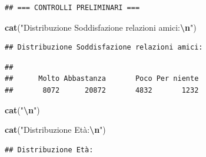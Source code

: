 \documentclass[
]{article}
\newenvironment{Shaded}{\begin{snugshade}}{\end{snugshade}}
\newcommand{\FunctionTok}[1]{\textcolor[rgb]{0.13,0.29,0.53}{\textbf{#1}}}
\newcommand{\NormalTok}[1]{#1}
\newcommand{\SpecialCharTok}[1]{\textcolor[rgb]{0.81,0.36,0.00}{\textbf{#1}}}
\newcommand{\StringTok}[1]{\textcolor[rgb]{0.31,0.60,0.02}{#1}}
\begin{document}
\begin{verbatim}
## === CONTROLLI PRELIMINARI ===
\end{verbatim}

\begin{Shaded}
\begin{Highlighting}[]
\FunctionTok{cat}\NormalTok{(}\StringTok{"Distribuzione Soddisfazione relazioni amici:}\SpecialCharTok{\textbackslash{}n}\StringTok{"}\NormalTok{)}
\end{Highlighting}
\end{Shaded}

\begin{verbatim}
## Distribuzione Soddisfazione relazioni amici:
\end{verbatim}

\begin{Shaded}
\end{Shaded}

\begin{verbatim}
## 
##      Molto Abbastanza       Poco Per niente 
##       8072      20872       4832       1232
\end{verbatim}

\begin{Shaded}
\begin{Highlighting}[]
\FunctionTok{cat}\NormalTok{(}\StringTok{"}\SpecialCharTok{\textbackslash{}n}\StringTok{"}\NormalTok{)}
\end{Highlighting}
\end{Shaded}

\begin{Shaded}
\begin{Highlighting}[]
\FunctionTok{cat}\NormalTok{(}\StringTok{"Distribuzione Età:}\SpecialCharTok{\textbackslash{}n}\StringTok{"}\NormalTok{)}
\end{Highlighting}
\end{Shaded}

\begin{verbatim}
## Distribuzione Età:
\end{verbatim}

\begin{Shaded}
\end{Shaded}
\end{document}
